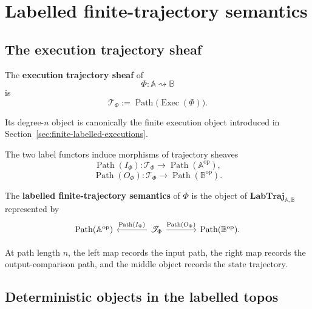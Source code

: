 \section{Labelled finite-trajectory semantics}
\label{sec:labelled-trajectory-semantics}

\subsection{The execution trajectory sheaf}
\label{subsec:execution-trajectory-sheaf}

\begin{definition}
\label{def:execution-trajectory-sheaf}
The \textbf{execution trajectory sheaf} of
\[
    \Phi:\mathbb A\rightsquigarrow\mathbb B
\]
is
\[
    \mathscr T_\Phi
    :=
    \operatorname{Path}
    \bigl(
        \operatorname{Exec}(\Phi)
    \bigr).
\]
\end{definition}

Its degree-\(n\) object is canonically the finite execution object introduced
in Section~\ref{sec:finite-labelled-executions}.

The two label functors induce morphisms of trajectory sheaves
\[
    \operatorname{Path}(I_\Phi):
    \mathscr T_\Phi
    \to
    \operatorname{Path}(\mathbb A^{\mathrm{op}}),
\]
\[
    \operatorname{Path}(O_\Phi):
    \mathscr T_\Phi
    \to
    \operatorname{Path}(\mathbb B^{\mathrm{op}}).
\]

\begin{definition}
\label{def:labelled-finite-trajectory-semantics}
The \textbf{labelled finite-trajectory semantics} of \(\Phi\) is the object
of \(\mathbf{LabTraj}_{\mathbb A,\mathbb B}\) represented by
\[
\begin{tikzcd}[column sep=large]
    \operatorname{Path}(\mathbb A^{\mathrm{op}})
    &
    \mathscr T_\Phi
        \arrow[l, "{\operatorname{Path}(I_\Phi)}"']
        \arrow[r, "{\operatorname{Path}(O_\Phi)}"]
    &
    \operatorname{Path}(\mathbb B^{\mathrm{op}}).
\end{tikzcd}
\]
\end{definition}

At path length \(n\), the left map records the input path, the right map
records the output-comparison path, and the middle object records the state
trajectory.

\subsection{Deterministic objects in the labelled topos}
\label{subsec:deterministic-objects-labelled-topos}

